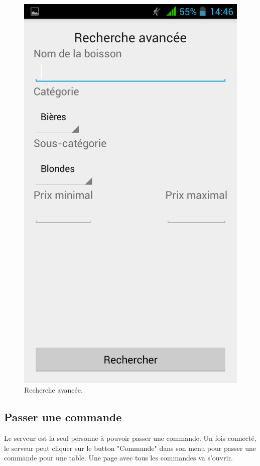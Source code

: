 \begin{figure}[H]
	\centering
	\includegraphics[scale=0.15]{img/search.png}
	\caption{Recherche avancée.}
	\label{fig:search}
\end{figure}

\subsection{Passer une commande}
Le serveur est la seul personne à pouvoir passer une commande. Un fois connecté, le serveur peut cliquer sur le button "Commande" dans son menu pour passer une commande pour une table. Une page avec tous les commandes va s'ouvrir.

